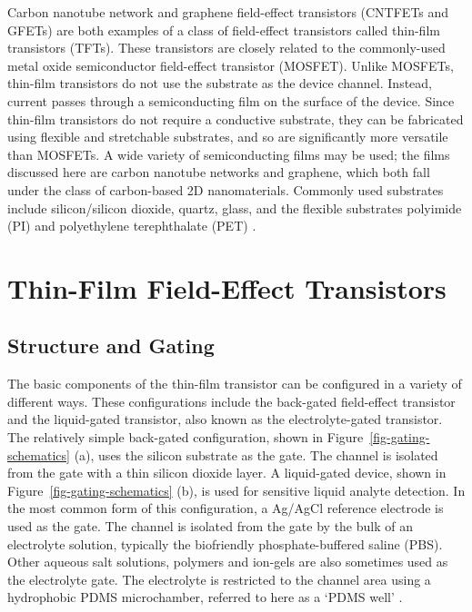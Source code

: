 \documentclass[
  a4paper,
]{scrbook}
\begin{document}
Carbon nanotube network and graphene field-effect transistors (CNTFETs
and GFETs) are both examples of a class of field-effect transistors
called thin-film transistors (TFTs). These transistors are closely
related to the commonly-used metal oxide semiconductor field-effect
transistor (MOSFET). Unlike MOSFETs, thin-film transistors do not use
the substrate as the device channel. Instead, current passes through a
semiconducting film on the surface of the device. Since thin-film
transistors do not require a conductive substrate, they can be
fabricated using flexible and stretchable substrates, and so are
significantly more versatile than MOSFETs. A wide variety of
semiconducting films may be used; the films discussed here are carbon
nanotube networks and graphene, which both fall under the class of
carbon-based 2D nanomaterials. Commonly used substrates include
silicon/silicon dioxide, quartz, glass, and the flexible substrates
polyimide (PI) and polyethylene terephthalate (PET)
\autocite{Sun2013,Shkodra2021}.

\hypertarget{sec-general-FETs}{%
\section{Thin-Film Field-Effect Transistors}\label{sec-general-FETs}}

\hypertarget{sec-gating}{%
\subsection{Structure and Gating}\label{sec-gating}}

The basic components of the thin-film transistor can be configured in a
variety of different ways. These configurations include the back-gated
field-effect transistor and the liquid-gated transistor, also known as
the electrolyte-gated transistor. The relatively simple back-gated
configuration, shown in Figure~\ref{fig-gating-schematics} (a), uses the
silicon substrate as the gate. The channel is isolated from the gate
with a thin silicon dioxide layer. A liquid-gated device, shown in
Figure~\ref{fig-gating-schematics} (b), is used for sensitive liquid
analyte detection. In the most common form of this configuration, a
Ag/AgCl reference electrode is used as the gate. The channel is isolated
from the gate by the bulk of an electrolyte solution, typically the
biofriendly phosphate-buffered saline (PBS). Other aqueous salt
solutions, polymers and ion-gels are also sometimes used as the
electrolyte gate. The electrolyte is restricted to the channel area
using a hydrophobic PDMS microchamber, referred to here as a `PDMS well'
\autocite{Avouris2007,Shkodra2021,Li2023}.
\end{document}
